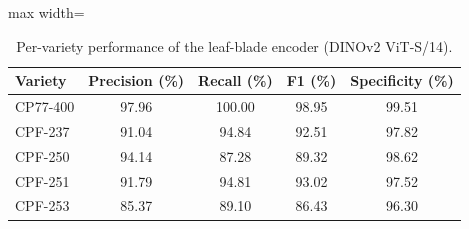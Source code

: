 \begin{table}[tbp]
\centering
\small
\caption{Per-variety performance of the leaf-blade encoder (DINOv2 ViT-S/14).}
\label{tab:perclass}
\begin{adjustbox}{max width=\textwidth}
\begin{tabular}{lcccc}
\toprule
Variety & Precision (\%) & Recall (\%) & F1 (\%) & Specificity (\%) \\
\midrule
CP77-400 & 97.96 & 100.00 & 98.95 & 99.51 \\
CPF-237 & 91.04 & 94.84 & 92.51 & 97.82 \\
CPF-250 & 94.14 & 87.28 & 89.32 & 98.62 \\
CPF-251 & 91.79 & 94.81 & 93.02 & 97.52 \\
CPF-253 & 85.37 & 89.10 & 86.43 & 96.30 \\
\bottomrule
\end{tabular}
\end{adjustbox}
\end{table}
